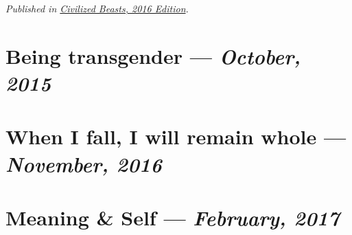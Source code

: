 \documentclass[10pt]{memoir}
\begin{document}
  \textit{Published in \underline{Civilized Beasts, 2016 Edition}.}
  \cleartoverso


  \section{Being transgender --- \textit{October, 2015}}

  
  \newpage


  \section{When I fall, I will remain whole --- \textit{November, 2016}}

  
  \cleartoverso


  \section{Meaning \& Self --- \textit{February, 2017}}

  
  \newpage
\end{document}
